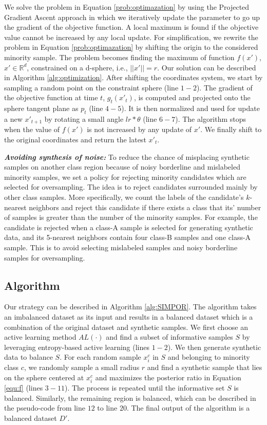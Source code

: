 We solve the problem in Equation \ref{prob:optimazation} by using the Projected Gradient Ascent approach in which we iteratively update the parameter to go up the gradient of the objective function. A local maximum is found if the objective value cannot be increased by any local update. For simplification, we rewrite the problem in Equation \ref{prob:optimazation} by shifting the origin to the considered minority sample. The problem becomes finding the maximum of function $f(x')$, $x' \in \mathbb{R}^d$, constrained on a d-sphere, i.e., $||x'||=r$. Our solution can be described in Algorithm \ref{alg:optimization}. After shifting the coordinates system, we start by sampling a random point on the constraint sphere (line $1-2$). The gradient of the objective function at time $t$, $g_t(x'_t)$, is computed and projected onto the sphere tangent plane as $p_t$ (line $4-5$). It is then normalized and used for update a new $x'_{t+1}$ by rotating a small angle $lr*\theta$ (line $6-7$). The algorithm stops when the value of $f(x')$ is not increased by any update of $x'$. We finally shift to the original coordinates and return the latest $x'_t$.   



\textbf{\textit{Avoiding synthesis of noise:}} To reduce the chance of misplacing synthetic samples on another class region because of noisy borderline and mislabeled minority samples, we set a policy for rejecting minority candidates which are selected for oversampling. The idea is to reject candidates surrounded mainly by other class samples. More specifically, we count the labels of the candidate's $k$-nearest neighbors and reject this candidate if there exists a class that its' number of samples is greater than the number of the minority samples. For example, the candidate is rejected when a class-A sample is selected for generating synthetic data, and its 5-nearest neighbors contain four class-B samples and one class-A sample. This is to avoid selecting mislabeled samples and noisy borderline samples for oversampling.        

\subsection{Algorithm}
Our strategy can be described in Algorithm \ref{alg:SIMPOR}. The algorithm takes an imbalanced dataset as its input and results in a balanced dataset which is a combination of the original dataset and synthetic samples. We first choose an active learning method $AL(\cdot)$ and find a subset of informative samples $S$ by leveraging entropy-based active learning (lines $1-2$). We then generate synthetic data to balance $S$. For each random sample $x_i^c$ in $S$ and belonging to minority class $c$, we randomly sample a small radius $r$ and find a synthetic sample that lies on the sphere centered at $x_i^c$ and maximizes the posterior ratio in Equation \ref{equ:f} (lines $3-11$). The process is repeated until the informative set $S$ is balanced. Similarly, the remaining region is balanced, which can be described in the pseudo-code from line $12$ to line $20$. The final output of the algorithm is a balanced dataset $D'$.       

